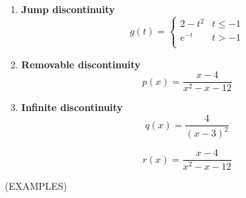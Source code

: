 \documentclass[11pt]{article}
\begin{document}
\begin{enumerate}
\item{{\bf Jump discontinuity}
      \begin{displaymath}
g(t) =   \left\{ \begin{array}{ll}
 2-t^2 & t \leq -1 \\
e^{-t} & t > -1 \\
\end{array} \right.
  \end{displaymath}

}

  \vspace{1in}

  

\item{ {\bf Removable discontinuity}
      \begin{displaymath}
p(x) = \frac{x-4}{x^2-x-12}
  \end{displaymath}

}

    \vspace{1.5in}

  
  \item{ {\bf Infinite discontinuity}
      \begin{displaymath}
q(x) = \frac{4}{(x-3)^2}
  \end{displaymath}

          \vspace{2in}

    \begin{displaymath}
r(x) = \frac{x-4}{x^2-x-12}
  \end{displaymath}

  }

    \vspace{0.5in}


    
  \end{enumerate}


\pagebreak

(EXAMPLES)\\
\end{document}
